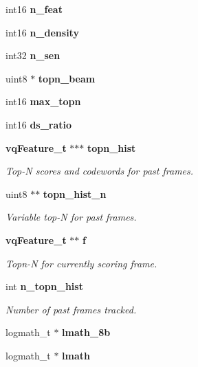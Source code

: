 \begin{DoxyCompactItemize}
\item 
int16 {\bfseries n\-\_\-feat}\label{structs2__semi__mgau__s_acc27ab32c9306b266eb8dbeb992b0dc2}

\item 
int16 {\bfseries n\-\_\-density}\label{structs2__semi__mgau__s_a976a8d1998fb717c7fee898eda43604b}

\item 
int32 {\bfseries n\-\_\-sen}\label{structs2__semi__mgau__s_a021287621e71f8b74f23197d0efd1e9e}

\item 
uint8 $\ast$ {\bfseries topn\-\_\-beam}\label{structs2__semi__mgau__s_af530876b144ac13df103afe2ccdba2fc}

\item 
int16 {\bfseries max\-\_\-topn}\label{structs2__semi__mgau__s_adda80afc828a938dcdd08f976417d35a}

\item 
int16 {\bfseries ds\-\_\-ratio}\label{structs2__semi__mgau__s_a91b9da8bb484f4552ba0ff47cb262d17}

\item 
{\bf vq\-Feature\-\_\-t} $\ast$$\ast$$\ast$ {\bf topn\-\_\-hist}
\begin{DoxyCompactList}\small\item\em Top-\/\-N scores and codewords for past frames. \end{DoxyCompactList}\item 
uint8 $\ast$$\ast$ {\bf topn\-\_\-hist\-\_\-n}
\begin{DoxyCompactList}\small\item\em Variable top-\/\-N for past frames. \end{DoxyCompactList}\item 
{\bf vq\-Feature\-\_\-t} $\ast$$\ast$ {\bf f}
\begin{DoxyCompactList}\small\item\em Topn-\/\-N for currently scoring frame. \end{DoxyCompactList}\item 
int {\bf n\-\_\-topn\-\_\-hist}
\begin{DoxyCompactList}\small\item\em Number of past frames tracked. \end{DoxyCompactList}\item 
logmath\-\_\-t $\ast$ {\bfseries lmath\-\_\-8b}\label{structs2__semi__mgau__s_a1900c90c8ab30d38288fb26b402eb325}

\item 
logmath\-\_\-t $\ast$ {\bfseries lmath}\label{structs2__semi__mgau__s_a8f8f7c72297132fb9a939c9981562ae6}

\end{DoxyCompactItemize}


